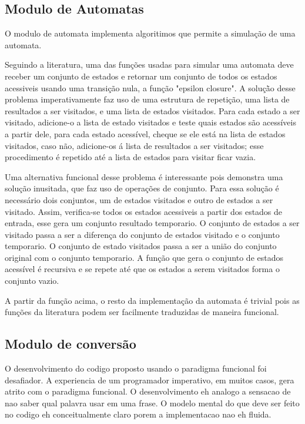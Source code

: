 \subsection{Modulo de Automatas}
O modulo de automata implementa algoritimos que permite a simulação de uma automata.

Seguindo a literatura, uma das funções usadas para simular uma automata deve receber um conjunto de estados e retornar um conjunto de todos os estados acessiveis usando uma transição nula, a função "epsilon closure".
A soluçã̀o desse problema imperativamente faz uso de uma estrutura de repetição, uma lista de resultados a ser visitados, e uma lista de estados visitados.
Para cada estado a ser visitado, adicione-o a lista de estado visitados e teste quais estados são acessíveis a partir dele, para cada estado acessível, cheque se ele está na lista de estados visitados, caso não, adicione-os á lista de resultados a ser visitados; esse procedimento é repetido até a lista de estados para visitar ficar vazia.

Uma alternativa funcional desse problema é interessante pois demonstra uma solução inusitada, que faz uso de operações de conjunto.
Para essa solução é necessário dois conjuntos, um de estados visitados e outro de estados a ser visitado.
Assim, verifica-se todos os estados acessiveis a partir dos estados de entrada, esse gera um conjunto resultado temporario.
O conjunto de estados a ser visitado passa a ser a diferença do conjunto de estados visitado e o conjunto temporario.
O conjunto de estado visitados passa a ser a união do conjunto original com o conjunto temporario.
A função que gera o conjunto de estados acessível é recursiva e se repete até que os estados a serem visitados forma o conjunto vazio.

A partir da função acima, o resto da implementação da automata é trivial pois as funções da literatura podem ser facilmente traduzidas de maneira funcional.

\subsection{Modulo de conversão}


O desenvolvimento do codigo proposto usando o paradigma funcional foi desafiador.
A experiencia de um programador imperativo, em muitos casos, gera atrito com o paradigma funcional.
O desenvolvimento eh analogo a sensacao de nao saber qual palavra usar em uma frase.
O modelo mental do que deve ser feito no codigo eh conceitualmente claro porem a implementacao nao eh fluida.

